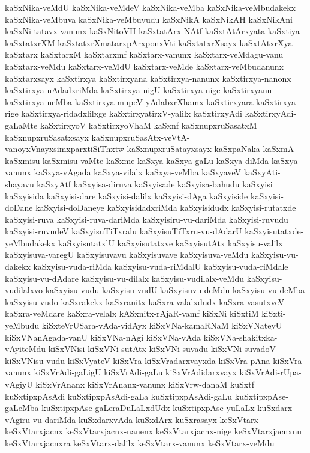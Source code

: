 {kaSxNika-veMdU
kaSxNika-veMdeV
kaSxNika-veMba
kaSxNika-veMbudakekx
kaSxNika-veMbuva
kaSxNika-veMbuvudu
kaSxNikA
kaSxNikAH
kaSxNikAni
kaSxNi-tatavx-vanunx
kaSxNitoVH
kaSxtatArx-NAtf
kaSxtAtArxyata
kaSxtiya
kaSxtatxrXM
kaSxtatxrXmatarxpArxponxVti
kaSxtatxrXsayx
kaSxtAtxrXya
kaSxtarx
kaSxtarxM
kaSxtarxmf
kaSxtarx-vanunx
kaSxtarx-veMdagu-vanu
kaSxtarx-veMdu
kaSxtarx-veMdU
kaSxtarx-veMde
kaSxtarx-veMbudanunx
kaSxtarxsayx
kaSxtirxya
kaSxtirxyana
kaSxtirxya-nanunx
kaSxtirxya-nanonx
kaSxtirxya-nAdadxriMda
kaSxtirxya-nigU
kaSxtirxya-nige
kaSxtirxyanu
kaSxtirxya-neMba
kaSxtirxya-mupeV-yAdabxrXhamx
kaSxtirxyara
kaSxtirxya-rige
kaSxtirxya-ridadxlilxge
kaSxtirxyatirxV-yalilx
kaSxtirxyAdi
kaSxtirxyAdi-gaLaMte
kaSxtirxyoV
kaSxtirxyoVhaM
kaSxnf
kaSxnupxruSasatxM
kaSxnupxruSasatxsayx
kaSxnupxruSasAtx-veVtA-vanoyxVnayxsimxparxtiSiThxtw
kaSxnupxruSatayxsayx
kaSxpaNaka
kaSxmA
kaSxmisu
kaSxmisu-vaMte
kaSxme
kaSxya
kaSxya-gaLu
kaSxya-diMda
kaSxya-vanunx
kaSxya-vAgada
kaSxya-vilalx
kaSxya-veMba
kaSxyaveV
kaSxyAti-shayavu
kaSxyAtf
kaSxyisa-diruva
kaSxyisade
kaSxyisa-bahudu
kaSxyisi
kaSxyisida
kaSxyisi-dare
kaSxyisi-dalilx
kaSxyisi-dAga
kaSxyiside
kaSxyisi-doDane
kaSxyisi-doDaneye
kaSxyisidadxriMda
kaSxyisidudx
kaSxyisi-rutatxde
kaSxyisi-ruva
kaSxyisi-ruva-dariMda
kaSxyisiru-vu-dariMda
kaSxyisi-ruvudu
kaSxyisi-ruvudeV
kaSxyisuTiTxralu
kaSxyisuTiTxru-vu-dAdarU
kaSxyisutatxde-yeMbudakekx
kaSxyisutatxlU
kaSxyisutatxve
kaSxyisutAtx
kaSxyisu-valilx
kaSxyisuva-varegU
kaSxyisuvavu
kaSxyisuvave
kaSxyisuva-veMdu
kaSxyisu-vu-dakekx
kaSxyisu-vuda-riMda
kaSxyisu-vuda-riMdalU
kaSxyisu-vuda-riMdale
kaSxyisu-vu-dAdare
kaSxyisu-vu-dilalx
kaSxyisu-vudilalx-veMdu
kaSxyisu-vudilalxvo
kaSxyisu-vudu
kaSxyisu-vudU
kaSxyisuvu-deMdu
kaSxyisu-vu-deMba
kaSxyisu-vudo
kaSxrakekx
kaSxranitx
kaSxra-valalxdudx
kaSxra-vasutxveV
kaSxra-veMdare
kaSxra-velalx
kASxnitx-rAjaR-vamf
kiSxNi
kiSxtiM
kiSxti-yeMbudu
kiSxteVrUSara-vAda-vidAyx
kiSxVNa-kamaRNaM
kiSxVNateyU
kiSxVNanAgada-vanU
kiSxVNa-nAgi
kiSxVNa-vAda
kiSxVNa-shakitxka-vAyiteMdu
kiSxVNisi
kiSxVNi-sutAtx
kiSxVNi-suvadu
kiSxVNi-suvadoV
kiSxVNisu-vudu
kiSxVyateV
kiSxVra
kiSxVradarxvayxda
kiSxVra-pAna
kiSxVra-vanunx
kiSxVrAdi-gaLigU
kiSxVrAdi-gaLu
kiSxVrAdidarxvayx
kiSxVrAdi-rUpa-vAgiyU
kiSxVrAnanx
kiSxVrAnanx-vanunx
kiSxVrw-danaM
kuSxtf
kuSxtipxpAsAdi
kuSxtipxpAsAdi-gaLa
kuSxtipxpAsAdi-gaLu
kuSxtipxpAse-gaLeMba
kuSxtipxpAse-gaLeraDuLaLxdUdx
kuSxtipxpAse-yuLaLx
kuSxdarx-vAgiru-vu-dariMda
kuSxdarxvAda
kuSxdArx
kuSxrasayx
keSxVtarx
keSxVtarxjacnx
keSxVtarxjacnx-nanenx
keSxVtarxjacnx-nige
keSxVtarxjacnxnu
keSxVtarxjacnxra
keSxVtarx-dalilx
keSxVtarx-vanunx
keSxVtarx-veMdu
}
